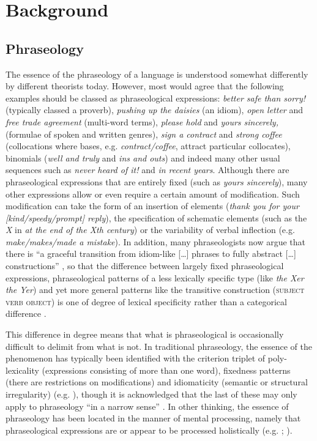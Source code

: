 \documentclass[output=paper]{langscibook}
\begin{document}
\section{Background}
\subsection{Phraseology}

The essence of the phraseology of a language is understood somewhat differently by different theorists today. However, most would agree that the following examples should be classed as phraseological expressions: \textit{better safe than sorry!} (typically classed a proverb), \textit{pushing up the daisies} (an idiom), \textit{open letter} and \textit{free trade agreement} (multi-word terms), \textit{please hold} and \textit{yours sincerely,} (formulae of spoken and written genres), \textit{sign a contract} and \textit{strong coffee} (collocations where bases, e.g. \textit{contract/coffee}, attract particular collocates), binomials (\textit{well and truly} and \textit{ins and outs}) and indeed many other usual sequences such as \textit{never heard of it!} and \textit{in recent years}. Although there are phraseological expressions that are entirely fixed (such as \textit{yours sincerely}), many other expressions allow or even require a certain amount of modification. Such modification can take the form of an insertion of elements (\textit{thank you for your [kind/speedy/prompt] reply}), the specification of schematic elements (such as the \textit{X} in \textit{at the end of the Xth century}) or the variability of verbal inflection (e.g. \textit{make/makes/made a mistake}). In addition, many phraseologists now argue that there is ``a graceful transition from idiom-like […] phrases to fully abstract […] constructions'' \citep[137]{Dominey2006}, so that the difference between largely fixed phraseological expressions, phraseological patterns of a less lexically specific type (like \textit{the Xer the Yer}) and yet more general patterns like the transitive construction (\textsc{subject verb object}) is one of degree of lexical specificity rather than a categorical difference \citep{Buerki2016}.

This difference in degree means that what is phraseological is occasionally difficult to delimit from what is not. In traditional phraseology, the essence of the phenomenon has typically been identified with the criterion triplet of poly-lexicality (expressions consisting of more than one word), fixedness patterns (there are restrictions on modifications) and idiomaticity (semantic or structural irregularity) (e.g. \citealt{BurgerEtAl1982,BurgerEtAl2007}), though it is acknowledged that the last of these may only apply to phraseology ``in a narrow sense'' \citep[11]{BurgerEtAl2007}. In other thinking, the essence of phraseology has been located in the manner of mental processing, namely that phraseological expressions are or appear to be processed holistically (e.g. \citealt[110]{Sinclair1991}; \citealt[9]{Wray2002}).
\end{document}
